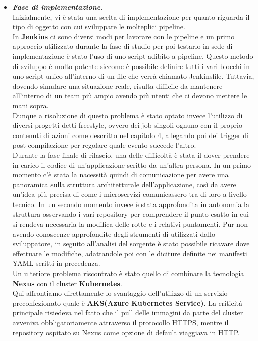 \documentclass[a4paper,12pt]{report}
\begin{document}
\begin{itemize}
\item \textit{\textbf{Fase di implementazione.}}\\
Inizialmente, vi è stata una scelta di implementazione per quanto riguarda il tipo di oggetto con cui sviluppare le molteplici pipeline.\\
In \textbf{Jenkins} ci sono diversi modi per lavorare con le pipeline e un primo approccio utilizzato durante la fase di studio per poi testarlo in sede di implementazione è stato l'uso di uno script adibito a pipeline. Questo metodo di sviluppo è molto potente siccome è possibile definire tutti i vari blocchi in uno script unico all'interno di un file che verrà chiamato Jenkinsfile. Tuttavia, dovendo simulare una situazione reale, risulta difficile da mantenere all'interno di un team più ampio avendo più utenti che ci devono mettere le mani sopra.\\
Dunque a risoluzione di questo problema è stato optato invece l'utilizzo di diversi progetti detti freestyle, ovvero dei job singoli ognuno con il proprio contenuti di azioni come descritto nel capitolo 4, allegando poi dei trigger di post-compilazione per regolare quale evento succede l'altro.\\
Durante la fase finale di rilascio, una delle difficoltà è stata il dover prendere in carico il codice di un'applicazione scritto da un'altra persona. In un primo momento c'è stata la nacessità quindi di comunicazione per avere una panoramica sulla struttura architetturale dell'applicazione, così da avere un'idea più precisa di come i microservizi comunicassero tra di loro a livello tecnico. In un secondo momento invece è stata approfondita in autonomia la struttura osservando i vari repository per comprendere il punto esatto in cui si rendeva necessaria la modifica delle rotte e i relativi puntamenti. Pur non avendo conoscenze approfondite degli strumenti di utilizzati dallo sviluppatore, in seguito all'analisi del sorgente è stato possibile ricavare dove effettuare le modifiche, adattandole poi con le diciture definite nei manifesti YAML scritti in precedenza.\\
Un ulteriore problema riscontrato è stato quello di combinare la tecnologia \textbf{Nexus} con il cluster \textbf{Kubernetes}.\\
Qui affrontiamo direttamente lo svantaggio dell'utilizzo di un servizio preconfezionato quale è \textbf{AKS(Azure Kubernetes Service)}. La criticità principale risiedeva nel fatto che il pull delle immagini da parte del cluster avveniva obbligatoriamente attraverso il protocollo HTTPS, mentre il repository ospitato su Nexus come opzione di default viaggiava in HTTP.\\

\end{itemize}
\end{document}
